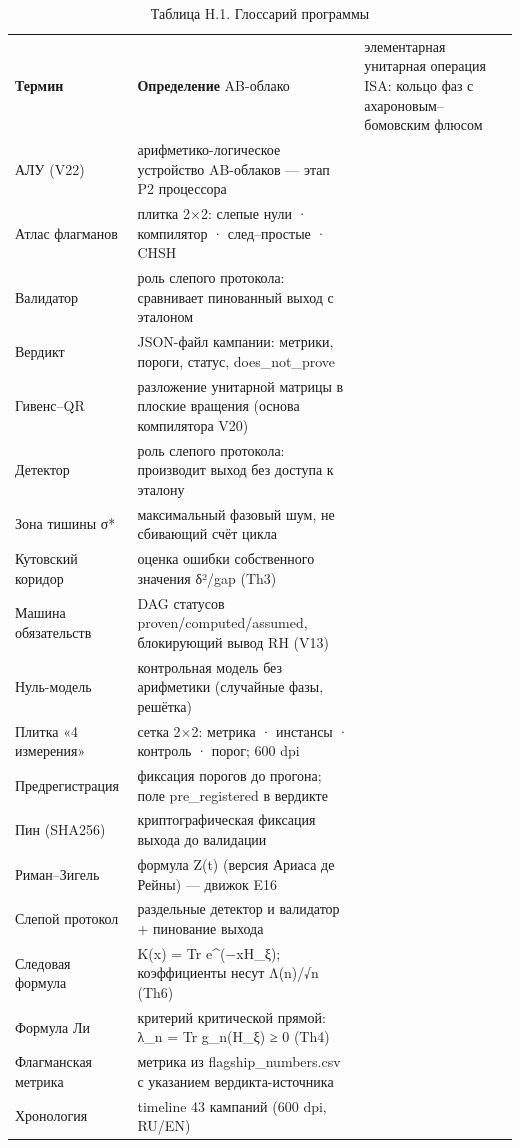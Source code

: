 \documentclass[11pt,a4paper]{article}
\begin{document}
\begin{table}[htbp]\centering\small
\caption{Таблица H.1. Глоссарий программы}
\begin{tabular}{p{} p{}}
\toprule
\textbf{Термин} & \textbf{Определение}
\midrule
AB-облако & элементарная унитарная операция ISA: кольцо фаз с ахароновым–бомовским флюсом \\
АЛУ (V22) & арифметико-логическое устройство AB-облаков — этап P2 процессора \\
Атлас флагманов & плитка 2×2: слепые нули · компилятор · след–простые · CHSH \\
Валидатор & роль слепого протокола: сравнивает пинованный выход с эталоном \\
Вердикт & JSON-файл кампании: метрики, пороги, статус, does\_not\_prove \\
Гивенс–QR & разложение унитарной матрицы в плоские вращения (основа компилятора V20) \\
Детектор & роль слепого протокола: производит выход без доступа к эталону \\
Зона тишины σ* & максимальный фазовый шум, не сбивающий счёт цикла \\
Кутовский коридор & оценка ошибки собственного значения δ²/gap (Th3) \\
Машина обязательств & DAG статусов proven/computed/assumed, блокирующий вывод RH (V13) \\
Нуль-модель & контрольная модель без арифметики (случайные фазы, решётка) \\
Плитка «4 измерения» & сетка 2×2: метрика · инстансы · контроль · порог; 600 dpi \\
Предрегистрация & фиксация порогов до прогона; поле pre\_registered в вердикте \\
Пин (SHA256) & криптографическая фиксация выхода до валидации \\
Риман–Зигель & формула Z(t) (версия Ариаса де Рейны) — движок E16 \\
Слепой протокол & раздельные детектор и валидатор + пинование выхода \\
Следовая формула & K(x) = Tr e\textasciicircum{}(−xH\_ξ); коэффициенты несут Λ(n)/√n (Th6) \\
Формула Ли & критерий критической прямой: λ\_n = Tr g\_n(H\_ξ) ≥ 0 (Th4) \\
Флагманская метрика & метрика из flagship\_numbers.csv с указанием вердикта-источника \\
Хронология & timeline 43 кампаний (600 dpi, RU/EN) \\

\end{tabular}
\end{table}
\end{document}
